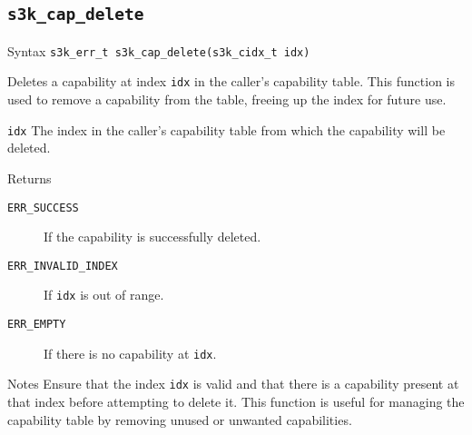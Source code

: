 \documentclass[a4paper,11pt]{article}
\newcommand{\syscall}[1]{\texttt{#1}}
\newenvironment{syscalldoc}[1]{
  \subsection{\syscall{#1}} %
  \begin{tcolorbox}
  \begin{description}[leftmargin=!,style=nextline,noitemsep]
}{
  \end{description}
  \end{tcolorbox}
}
\begin{document}
\begin{syscalldoc}{s3k\_cap\_delete}
  \item[Syntax] \lstinline{s3k_err_t s3k_cap_delete(s3k_cidx_t idx)}

  \item[Description] Deletes a capability at index \verb|idx| in the caller's capability table. This function is used to remove a capability from the table, freeing up the index for future use.

  \item[Parameters]
    \begin{description}
      \item[]
      \item[\texttt{idx}] The index in the caller's capability table from which the capability will be deleted.
    \end{description}

  \item[Returns]
    \begin{description}
      \item[]
      \item[\texttt{ERR\_SUCCESS}] If the capability is successfully deleted.
      \item[\texttt{ERR\_INVALID\_INDEX}] If \verb|idx| is out of range.
      \item[\texttt{ERR\_EMPTY}] If there is no capability at \verb|idx|.
    \end{description}

  \item[Notes] Ensure that the index \verb|idx| is valid and that there is a capability present at that index before attempting to delete it. This function is useful for managing the capability table by removing unused or unwanted capabilities.
\end{syscalldoc}
\end{document}
